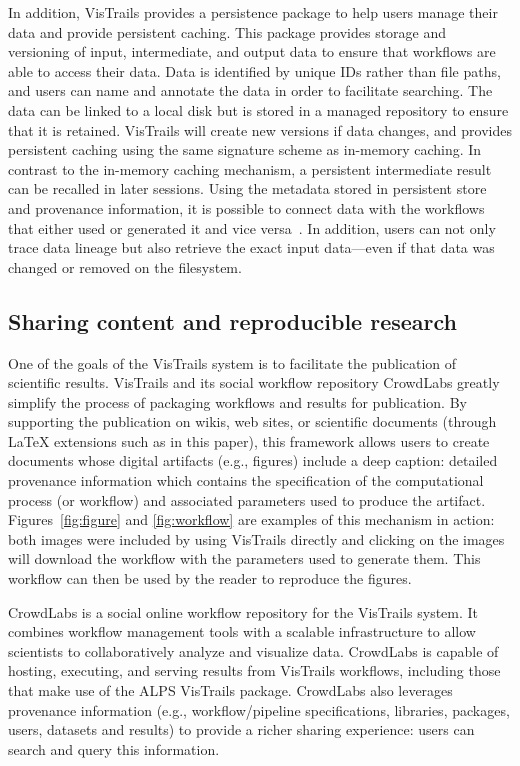 \documentclass[12pt]{iopart}
\newcommand{\eg}{e.g.,\xspace}
\begin{document}
In addition, VisTrails provides a persistence package to help users
manage their data and provide persistent caching.  This package
provides storage and versioning of input, intermediate, and output
data to ensure that workflows are able to access their data.  Data is
identified by unique IDs rather than file paths, and users can name
and annotate the data in order to facilitate searching.  The data can
be linked to a local disk but is stored in a managed repository to
ensure that it is retained.  VisTrails will create new versions if
data changes, and provides persistent caching using the same signature
scheme as in-memory caching.  In contrast to the in-memory caching
mechanism, a persistent intermediate result can be recalled in later
sessions.  Using the metadata stored in persistent store and
provenance information, it is possible to connect data with the
workflows that either used or generated it and vice
versa~\cite{koop@ssdbm2010}.  In addition, users can not only trace
data lineage but also retrieve the exact input data---even if that
data was changed or removed on the filesystem.


\subsection{Sharing content and reproducible research}

One of the goals of the VisTrails system is to
facilitate the publication of scientific results. VisTrails and its social workflow repository
CrowdLabs greatly simplify the process of packaging workflows and
results for publication. By supporting the publication on wikis, 
web sites, or scientific documents (through LaTeX extensions such as in this paper), this framework allows users to create
documents whose digital artifacts (\eg figures) include a deep
caption: detailed provenance information which contains the
specification of the computational process (or workflow) and
associated parameters used to produce the
artifact. Figures~\ref{fig:figure} and \ref{fig:workflow} are examples
of this mechanism in action: both images were included by using
VisTrails directly and clicking on the images will download the
workflow with the parameters used to generate them. This workflow can then be used by the reader to reproduce the figures.

CrowdLabs is a social online workflow repository for the VisTrails
system. It combines workflow management tools with a scalable
infrastructure to allow scientists to collaboratively analyze and
visualize data. CrowdLabs is capable of hosting, executing, and
serving results from VisTrails workflows, including those that make
use of the ALPS VisTrails package. CrowdLabs also leverages provenance
information (\eg workflow/pipeline specifications, libraries,
packages, users, datasets and results) to provide a richer sharing
experience: users can search and query this information.
\end{document}
